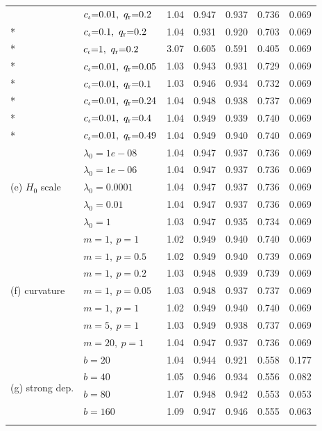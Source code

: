 \begin{longtable}{llrrrrr}
 & $c_\iota{=}0.01,\ q_{\mathrm r}{=}0.2$ & 1.04 & 0.947 & 0.937 & 0.736 & 0.069 \\*
 & $c_\iota{=}0.1,\ \qr{=}0.2$ & 1.04 & 0.931 & 0.920 & 0.703 & 0.069 \\*
 & $c_\iota{=}1,\ \qr{=}0.2$ & 3.07 & 0.605 & 0.591 & 0.405 & 0.069 \\*
 & $c_\iota{=}0.01,\ q_{\mathrm r}{=}0.05$ & 1.03 & 0.943 & 0.931 & 0.729 & 0.069 \\*
 & $c_\iota{=}0.01,\ q_{\mathrm r}{=}0.1$ & 1.03 & 0.946 & 0.934 & 0.732 & 0.069 \\*
 & $c_\iota{=}0.01,\ q_{\mathrm r}{=}0.24$ & 1.04 & 0.948 & 0.938 & 0.737 & 0.069 \\*
 & $c_\iota{=}0.01,\ q_{\mathrm r}{=}0.4$ & 1.04 & 0.949 & 0.939 & 0.740 & 0.069 \\*
 & $c_\iota{=}0.01,\ q_{\mathrm r}{=}0.49$ & 1.04 & 0.949 & 0.940 & 0.740 & 0.069 \\
\midrule
\multirow{5}{*}{(e) $H_0$ scale} & $\lambda_0=1e-08$ & 1.04 & 0.947 & 0.937 & 0.736 & 0.069 \\*
 & $\lambda_0=1e-06$ & 1.04 & 0.947 & 0.937 & 0.736 & 0.069 \\*
 & $\lambda_0=0.0001$ & 1.04 & 0.947 & 0.937 & 0.736 & 0.069 \\*
 & $\lambda_0=0.01$ & 1.04 & 0.947 & 0.937 & 0.736 & 0.069 \\*
 & $\lambda_0=1$ & 1.03 & 0.947 & 0.935 & 0.734 & 0.069 \\
\midrule
\multirow{7}{*}{(f) curvature} & $m=1,\ p=1$ & 1.02 & 0.949 & 0.940 & 0.740 & 0.069 \\*
 & $m=1,\ p=0.5$ & 1.02 & 0.949 & 0.940 & 0.739 & 0.069 \\*
 & $m=1,\ p=0.2$ & 1.03 & 0.948 & 0.939 & 0.739 & 0.069 \\*
 & $m=1,\ p=0.05$ & 1.03 & 0.948 & 0.937 & 0.737 & 0.069 \\*
 & $m=1,\ p=1$ & 1.02 & 0.949 & 0.940 & 0.740 & 0.069 \\*
 & $m=5,\ p=1$ & 1.03 & 0.949 & 0.938 & 0.737 & 0.069 \\*
 & $m=20,\ p=1$ & 1.04 & 0.947 & 0.937 & 0.736 & 0.069 \\
\midrule
\multirow{5}{*}{(g) strong dep.} & $b=20$ & 1.04 & 0.944 & 0.921 & 0.558 & 0.177 \\*
 & $b=40$ & 1.05 & 0.946 & 0.934 & 0.556 & 0.082 \\*
 & $b=80$ & 1.07 & 0.948 & 0.942 & 0.553 & 0.053 \\*
 & $b=160$ & 1.09 & 0.947 & 0.946 & 0.555 & 0.063 \\*

\end{longtable}
